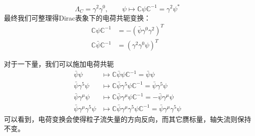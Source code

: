 \begin{equation}
\Lambda_C=\gamma^2\gamma^0,\qquad \psi\mapsto\mathbb{C}\psi\mathbb{C}^{-1}=\gamma^2\psi^*
\end{equation}
最终我们可整理得Dirac表象下的电荷共轭变换：
\begin{align}
\mathbb{C}\psi\mathbb{C}^{-1}&= -(\bar{\psi}\gamma^0\gamma^2)^T\\
\mathbb{C}\bar{\psi}\mathbb{C}^{-1}&=(\gamma^2\gamma^0\psi)^T
\end{align}

对于一下量，我们可以施加电荷共轭
\begin{align}
\bar{\psi}\psi&\mapsto \mathbb{C}\bar{\psi}\psi\mathbb{C}^{-1}=\bar{\psi}\psi\\
\bar{\psi}\gamma^5\psi&\mapsto \mathbb{C}\bar{\psi}\gamma^5\psi\mathbb{C}^{-1}=\bar{\psi}\gamma^5\psi\\
    \bar{\psi}\gamma^\mu\psi&\mapsto \mathbb{C}\bar{\psi}\gamma^\mu\psi\mathbb{C}^{-1}=-\bar{\psi}\gamma^\mu\psi\\
    \bar{\psi}\gamma^\mu\gamma^5\psi&\mapsto \mathbb{C}\bar{\psi}\gamma^\mu\gamma^5\psi\mathbb{C}^{-1}=\bar{\psi}\gamma^\mu\gamma^5\psi
\end{align}
可以看到，电荷变换会使得粒子流失量的方向反向，而其它赝标量，轴失流则保持不变。

